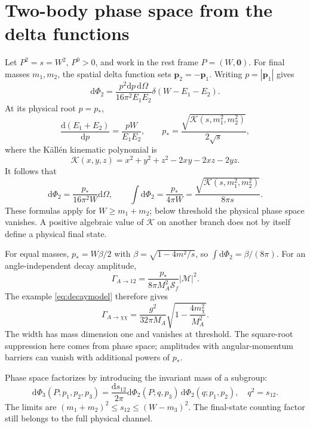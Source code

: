 \documentclass[11pt]{article}
\newcommand{\dd}{\mathrm d}
\newcommand{\module}[1]{\clearpage\section{#1}}
\newcommand{\cM}{\mathcal M}
\newcommand{\cS}{\mathcal S}
\newcommand{\Kallen}{\mathcal K}
\begin{document}
\module{Two-body phase space from the delta functions}
Let \(P^2=s=W^2\), \(P^0>0\), and work in the rest frame \(P=(W,\bm0)\).
For final masses \(m_1,m_2\), the spatial delta function sets
\(\bm p_2=-\bm p_1\). Writing \(p=|\bm p_1|\) gives
\begin{equation}
 \dd\Phi_2=\frac{p^2\dd p\,\dd\Omega}{16\pi^2 E_1E_2}
 \delta(W-E_1-E_2).
\end{equation}
At its physical root \(p=p_*\),
\begin{equation}
 \frac{\dd(E_1+E_2)}{\dd p}=\frac{pW}{E_1E_2},\qquad
 p_* =\frac{\sqrt{\Kallen(s,m_1^2,m_2^2)}}{2\sqrt{s}},
\end{equation}
where the K\"all\'en kinematic polynomial is
\begin{equation}
 \Kallen(x,y,z)=x^2+y^2+z^2-2xy-2xz-2yz.
\end{equation}
It follows that
\begin{equation}
 \boxed{\ \dd\Phi_2=\frac{p_*}{16\pi^2 W}\dd\Omega,\qquad
 \int\dd\Phi_2=\frac{p_*}{4\pi W}
 =\frac{\sqrt{\Kallen(s,m_1^2,m_2^2)}}{8\pi s}.\ }
 \label{eq:two}
\end{equation}
These formulas apply for \(W\geq m_1+m_2\); below threshold the physical
phase space vanishes. A positive algebraic value of \(\Kallen\) on another
branch does not by itself define a physical final state.

For equal masses, \(p_*=W\beta/2\) with
\(\beta=\sqrt{1-4m^2/s}\), so \(\int\dd\Phi_2=\beta/(8\pi)\).
For an angle-independent decay amplitude,
\begin{equation}
 \Gamma_{A\to12}=\frac{p_*}{8\pi M_A^2\cS_f}|\cM|^2.
\end{equation}
The example \eqref{eq:decaymodel} therefore gives
\begin{equation}
 \boxed{\quad \Gamma_{A\to\chi\chi}
 =\frac{g^2}{32\pi M_A}\sqrt{1-\frac{4m_\chi^2}{M_A^2}}.\quad}
 \label{eq:examplewidth}
\end{equation}
The width has mass dimension one and vanishes at threshold. The square-root
suppression here comes from phase space; amplitudes with angular-momentum
barriers can vanish with additional powers of \(p_*\).

\begin{remarkbox}
Phase space factorizes by introducing the invariant mass of a subgroup:
\[
 \dd\Phi_3(P;p_1,p_2,p_3)=\frac{\dd s_{12}}{2\pi}
 \dd\Phi_2(P;q,p_3)\,\dd\Phi_2(q;p_1,p_2),\quad q^2=s_{12}.
\]
The limits are \((m_1+m_2)^2\leq s_{12}\leq(W-m_3)^2\).
The final-state counting factor still belongs to the full physical channel.
\end{remarkbox}
\end{document}
